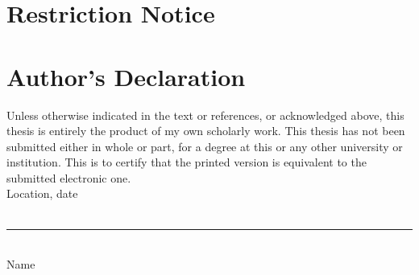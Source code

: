 \section*{Restriction Notice}\label{sec:restrictionnotice}

\section*{Author's Declaration}\label{sec:authorsdeclaration}
Unless otherwise indicated in the text or references, or acknowledged above, this thesis is entirely the product of my own scholarly work. This thesis has not been submitted either in whole or part, for a degree at this or any other university or institution. This is to certify that the printed version is equivalent to the submitted electronic one.
\vspace{3em}\\
Location, date
\vspace{1em}\\
\vspace{1.75cm}\\
\rule{6cm}{0.4pt}\\
Name
\pagebreak
\newpage